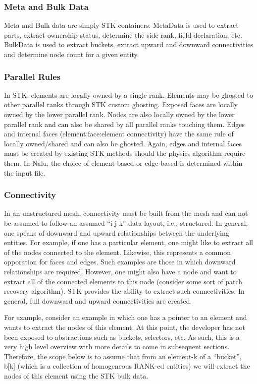 \subsubsection{Meta and Bulk Data}
Meta and Bulk data are simply STK containers. MetaData is used to extract parts, 
extract ownership status, determine the side rank, field declaration, etc. 
BulkData is used to extract buckets, extract upward and downward connectivities 
and determine node count for a given entity.

\subsubsection{Parallel Rules}
In STK, elements are locally owned by a single rank. Elements may be ghosted to other parallel ranks
through STK custom ghosting. Exposed faces are locally owned by the lower parallel rank. Nodes
are also locally owned by the lower parallel rank and can also be shared by all parallel ranks touching
them. Edges and internal faces (element:face:element connectivity) have the same rule of locally 
owned/shared and can also be ghosted. Again, edges and internal faces must be created by existing
STK methods should the physics algorithm require them. In Nalu, the choice of element-based 
or edge-based is determined within the input file.

\subsubsection{Connectivity}
In an unstructured mesh, connectivity must be built from the mesh and can not be assumed to 
follow an assumed ``i-j-k'' data layout, i.e., structured. In general, one speaks of downward and upward 
relationships between the underlying entities. For example, if one has a particular element, one might
like to extract all of the nodes connected to the element. Likewise, this represents a common opporation
for faces and edges. Such examples are those in which downward relationships are required. 
However, one might also have a node and want to extract all of the connected elements to this 
node (consider some sort of patch recovery algorithm). STK provides the ability to extract 
such connectivities. In general, full downward and upward connectivities are created.

For example, consider an example in which one has a pointer to an element and wants to 
extract the nodes of this element. At this point, the developer has not been exposed to 
abstractions such as buckets, selectors, etc. As such, this is a very high level overview
with more details to come in subsequent sections. Therefore, the scope below is to assume that
from an element-k of a ``bucket'', b[k] (which is a collection of homogeneous RANK-ed entities) 
we will extract the nodes of this element using the STK bulk data.

